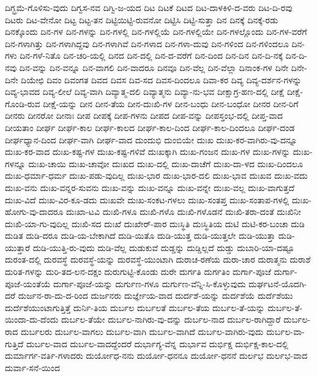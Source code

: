 {ದಿಗ್ಭ್ರಮೆ-ಗೊಳಿಸು-ವುದು
ದಿಗ್ವಸ-ನವ
ದಿಗ್ವಿ-ಜ-ಯದ
ದಿಟ
ದಿಟಕೆ
ದಿಟದ
ದಿಟ-ದಾಳಕಿಳಿ-ದ-ವರು
ದಿಟ-ದಿ-ರವು
ದಿಟರು
ದಿಟ-ವೇನೋ
ದಿಟ್ಟ
ದಿಟ್ಟ-ತನ
ದಿಟ್ಟಿಯಿಟ್ಟಿ-ರುವನೋ
ದಿಟ್ಟಿಸಿ
ದಿಟ್ಟಿ-ಸುತ್ತಾ
ದಿನ
ದಿನಕ್ಕೆ
ದಿನಕ್ಕೆ-ರಡು
ದಿನಕ್ಕೊಂದು
ದಿನ-ಗಳ
ದಿನ-ಗಳನ್ನು
ದಿನ-ಗಳಲ್ಲಿ
ದಿನ-ಗಳಲ್ಲಿಯೆ
ದಿನ-ಗಳಲ್ಲಿಯೇ
ದಿನ-ಗಳಲ್ಲೊಂದು
ದಿನ-ಗಳ-ವರೆಗೆ
ದಿನ-ಗಳಾಗಿತ್ತು
ದಿನ-ಗಳಾಗಿದ್ದವು
ದಿನ-ಗಳಾಗಿವೆ
ದಿನ-ಗಳಾದ
ದಿನ-ಗಳಾ-ದುವು
ದಿನ-ಗಳಿಂದ
ದಿನ-ಗಳಿಂದಲೂ
ದಿನ-ಗಳು
ದಿನ-ಗಳೆ-ನಿತೊ
ದಿನ-ಚರಿ-ಯಲ್ಲಿ
ದಿನದ
ದಿನ-ದಲ್ಲಿ
ದಿನ-ದ-ವರೆಗೆ
ದಿನ-ದಿಂದ
ದಿನ-ದಿನ
ದಿನ-ದಿ-ನಕ್ಕೆ
ದಿನ-ದಿ-ನವು
ದಿನ-ವನ್ನು
ದಿನ-ವನ್ನೂ
ದಿನ-ವಾಗಲಿ
ದಿನ-ವಾದರೂ
ದಿನವೂ
ದಿನ-ವೆಲ್ಲ
ದಿನ-ವೆಲ್ಲಾ
ದಿನಾಂಕ-ಗಳ
ದಿನೇ
ದಿನೇ-ದಿನೇ
ದಿಯೇಛಿ
ದಿವಂ
ದಿವಂಗತ
ದಿವದ
ದಿವಸ
ದಿವ-ಸದ
ದಿವಸ-ದಿಂದಲೂ
ದಿವಾ-ಕರ
ದಿವ್ಯ
ದಿವ್ಯ-ದರ್ಶನ-ಗಳನ್ನು
ದಿವ್ಯ-ಭಾವದ
ದಿವ್ಯ-ಲೀಲೆ
ದಿವ್ಯ-ವಾಗಿ
ದಿವ್ಯಾತ್ಮ-ದಲಿ
ದಿವ್ಯಾತ್ಮನು
ದಿವ್ಯಾ-ನು-ಭವ
ದೀಕ್ಷಾಗ್ರ-ಹಣ-ದಲ್ಲಿ
ದೀಕ್ಷೆ
ದೀಕ್ಷೆ-ಗೊಂಡಿ-ರುವ
ದೀಕ್ಷೆ-ಯನ್ನು
ದೀನ
ದೀನ-ತೆಯ
ದೀನ-ದುಃಖಿ-ಗಳ
ದೀನ-ಬಂಧು
ದೀನ-ಬಂಧೋ
ದೀನರ
ದೀನ-ರಿಗೆ
ದೀನರು
ದೀನರೋ
ದೀನಾಃ
ದೀಪ
ದೀಪಕ್ಕೆ
ದೀಪ-ಗಳನು
ದೀಪದ
ದೀಪ-ವನ್ನು
ದೀಪಸ್ತಂಭ-ದಲ್ಲಿ
ದೀಪ್ತ-ವಾದ
ದೀಯತಾಂ
ದೀರ್ಘ
ದೀರ್ಘ-ಕಾಲ
ದೀರ್ಘ-ಕಾಲದ
ದೀರ್ಘ-ಕಾಲ-ದಿಂದ
ದೀರ್ಘ-ಕಾಲ-ದಿಂದಲೂ
ದೀರ್ಘ-ದಂಡ
ದೀರ್ಘಧ್ಯಾನ-ದಿಂದ
ದೀರ್ಘ-ವಾಗಿ
ದೀರ್ಘ-ವಾದ
ದುಂದುಭಿ
ದುಂಬಿಯೇ
ದುಃಖ
ದುಃಖ-ಕರ-ವಾಗಿರು-ವು-ದನ್ನೂ
ದುಃಖ-ಕರ-ವಾದ
ದುಃಖ-ಕಷ್ಟ-ಗಳ
ದುಃಖ-ಕಷ್ಟ-ಗಳಿವೆ
ದುಃಖಕ್ಕಾಗಿ
ದುಃಖ-ಗಂಜನ
ದುಃಖ-ಗಳ
ದುಃಖ-ಗಳನ್ನು
ದುಃಖ-ಗಳನ್ನೂ
ದುಃಖ-ಚಾಯಿ
ದುಃಖ-ಚಾವೋ
ದುಃಖದ
ದುಃಖ-ದಲ್ಲಿ
ದುಃಖ-ದಾಚೆಗೆ
ದುಃಖ-ದಾ-ಳದ
ದುಃಖ-ದಿಂದಲೂ
ದುಃಖ-ಧರ್ಮಾ-ಧರ್ಮ
ದುಃಖ-ಪಡು-ವುದಿಲ್ಲ
ದುಃಖ-ಭಾರ
ದುಃಖ-ಭಾರ-ದಲಿ
ದುಃಖ-ಭಾವ
ದುಃಖವ
ದುಃಖ-ವದು
ದುಃಖ-ವನು
ದುಃಖ-ವನ್ನರ-ಸುವನು
ದುಃಖ-ವನ್ನು
ದುಃಖ-ವನ್ನೂ
ದುಃಖ-ವನ್ನೇ
ದುಃಖ-ವಲ್ಲ
ದುಃಖ-ವಾಗುತ್ತದೆ
ದುಃಖ-ವಿದೆ
ದುಃಖ-ವಿರ-ಕೂ-ಡದು
ದುಃಖವೇ
ದುಃಖ-ಸಂಕಟ-ಗಳಲು
ದುಃಖ-ಸಂತಪ್ತ
ದುಃಖ-ಸಂತಾಪ-ಗಳಲ್ಲಿ
ದುಃಖ-ಹೋಗು-ವು-ದಾದರೂ
ದುಃಖಾ-ಟವಿ
ದುಃಖಿ-ಗಳೂ
ದುಃಖಿ-ಗಳೊ
ದುಃಖಿ-ಗಳೊಡನೆ
ದುಃಖಿ-ತರಾ-ದಂತೆ
ದುಃಖಿನೀ
ದುಃಖಿ-ಯಾ-ಗು-ವುದಿಲ್ಲ
ದುಃಖಿ-ಸದ
ದುಃಖೆ
ದುಃಖೇರ್-ಪಾರ
ದುಃಸ್ಥಿತಿ
ದುಃಸ್ಥಿತಿಯ
ದುಟಿ
ದುಟಿ-ಕರ-ಬಂಚಾ
ದುಡಿ
ದುಡಿತ
ದುಡಿ-ದರೂ
ದುಡಿ-ಯ-ಬೇಕಾಗಿದೆ
ದುಡಿ-ಯಿತೊ
ದುಡಿ-ಯುತ್ತ
ದುಡಿ-ಯುತ್ತಲೇ
ದುಡಿ-ಯುತ್ತಾ
ದುಡಿ-ಯುತ್ತಾರೆ
ದುಡಿ-ಯುತ್ತಿ-ರು-ವುದು
ದುಡಿ-ವೆಲ್ಲ
ದುಡುಕುವೆ
ದುಡ್ಡನ್ನು
ದುಡ್ಡಿಲ್ಲದೆ
ದುಡ್ಡು
ದುಬಾರಿ-ಯಾ-ದಷ್ಟೂ
ದುರಂತ-ದಲ್ಲಿ
ದುರವಸ್ಥೆ
ದುರವಸ್ಥೆ-ಯನ್ನು
ದುರವಸ್ಥೆ-ಯುಂಟಾಗಿ
ದುರಾಚ-ರಣೆಯ
ದುರಾ-ಚಾರ
ದುರಾತ್ಮನು
ದುರಾಶೆ
ದುರಿತ-ಗಳನ್ನು
ದುರಿ-ತದ-ಲನ-ದಕ್ಷಂ
ದುರುಗುಟ್ಟಿ-ಕೊಂಡು
ದುರೇ
ದುರ್ಗತಿ
ದುರ್ಗತಿಂ
ದುರ್ಗಾ-ಪೂಜೆ
ದುರ್ಗಾ-ಪೂಜೆ-ಯಂತೆಯೆ
ದುರ್ಗಾ-ಪೂಜೆ-ಯನ್ನು
ದುರ್ಗುಣ-ಗಳೂ
ದುರ್ಗುಣ-ವೆನ್ನಿ-ಸಿ-ಕೊಳ್ಳುವುದು
ದುರ್ಘಟನೆ-ಯೊದಗಿ-ದರೆ
ದುರ್ಜನ-ರಾ-ದು-ದ-ರಿಂದ
ದುರ್ಜನರು
ದುರ್ಜ್ಞೇಯ-ವಾದ
ದುರ್ದಶೆ-ಯನ್ನು
ದುರ್ದಶೆಯೆ
ದುರ್ದೆಶೆಯು
ದುರ್ದೆಶೆಯುಂಟಾಗುತ್ತಿತ್ತೆ
ದುರ್ನಿ-ತಿಯ
ದುರ್ಬಲ
ದುರ್ಬಲತೆ
ದುರ್ಬಲ-ತೆಯ
ದುರ್ಬಲ-ತೆ-ಯನ್ನು
ದುರ್ಬಲ-ತೆ-ಯಿಂದಾ-ದು-ದೆಂದು
ದುರ್ಬಲ-ತೆಯೇ
ದುರ್ಬಲ-ನಾಗಿರು-ವು-ದನ್ನು
ದುರ್ಬಲ-ನಾದ
ದುರ್ಬಲ-ರಾಗಿದ್ದಾರೆ
ದುರ್ಬಲ-ರಾದ
ದುರ್ಬಲರು
ದುರ್ಬಲ-ವಾಗಲು
ದುರ್ಬಲ-ವಾಗಿ
ದುರ್ಬಲ-ವಾಗಿದೆ
ದುರ್ಬಲ-ವಾಗಿರು-ವುದು
ದುರ್ಬಲ-ವಾ-ಗುತ್ತಿದೆ
ದುರ್ಬಲ-ವಾದ
ದುರ್ಬಲ-ವಾದದ್ದೆಂದರೆ
ದುರ್ಭಾಗ್ಯ-ವೆನ್ನ
ದುರ್ಭಾವ
ದುರ್ಭಿಕ್ಷ
ದುರ್ಭಿಕ್ಷ-ಕಾಲ-ದಲ್ಲಿ
ದುರ್ಮಾರ್ಗ-ವರ್ತಿ-ಗಳಾದರು
ದುರ್ಯೋಧ-ನನು
ದುರ್ಯೋ-ಧನನೂ
ದುರ್ಯೋ-ಧನನೆ
ದುರ್ಲಭ
ದುರ್ಲಭ-ವಾದ
ದುರ್ವಾ-ಸನೆ-ಯಿಂದ
}
